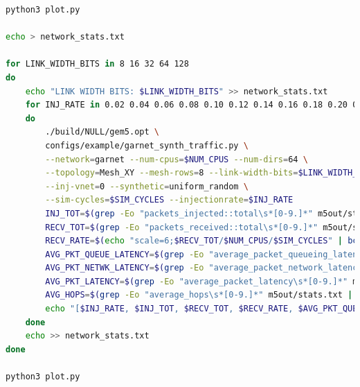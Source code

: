 \documentclass{article}
\begin{document}
\begin{lstlisting}[language=bash]
python3 plot.py

echo > network_stats.txt

for LINK_WIDTH_BITS in 8 16 32 64 128
do
	echo "LINK WIDTH BITS: $LINK_WIDTH_BITS" >> network_stats.txt
	for INJ_RATE in 0.02 0.04 0.06 0.08 0.10 0.12 0.14 0.16 0.18 0.20 0.22 0.24 0.26 0.28 0.30 0.32 0.34 0.36 0.38 0.40 0.42 0.44 0.46 0.48 0.50 0.52 0.54 0.56 0.58 0.60 0.62 0.64 0.66 0.68 0.70 0.72 0.74 0.76 0.78 0.80
	do
		./build/NULL/gem5.opt \
		configs/example/garnet_synth_traffic.py \
		--network=garnet --num-cpus=$NUM_CPUS --num-dirs=64 \
		--topology=Mesh_XY --mesh-rows=8 --link-width-bits=$LINK_WIDTH_BITS\
		--inj-vnet=0 --synthetic=uniform_random \
		--sim-cycles=$SIM_CYCLES --injectionrate=$INJ_RATE
		INJ_TOT=$(grep -Eo "packets_injected::total\s*[0-9.]*" m5out/stats.txt | grep -Eo "[0-9.]*")
		RECV_TOT=$(grep -Eo "packets_received::total\s*[0-9.]*" m5out/stats.txt | grep -Eo "[0-9.]*")
		RECV_RATE=$(echo "scale=6;$RECV_TOT/$NUM_CPUS/$SIM_CYCLES" | bc)
		AVG_PKT_QUEUE_LATENCY=$(grep -Eo "average_packet_queueing_latency\s*[0-9.]*" m5out/stats.txt | grep -Eo "[0-9.]*")
		AVG_PKT_NETWK_LATENCY=$(grep -Eo "average_packet_network_latency\s*[0-9.]*" m5out/stats.txt | grep -Eo "[0-9.]*")
		AVG_PKT_LATENCY=$(grep -Eo "average_packet_latency\s*[0-9.]*" m5out/stats.txt | grep -Eo "[0-9.]*")
		AVG_HOPS=$(grep -Eo "average_hops\s*[0-9.]*" m5out/stats.txt | grep -Eo "[0-9.]*")
		echo "[$INJ_RATE, $INJ_TOT, $RECV_TOT, $RECV_RATE, $AVG_PKT_QUEUE_LATENCY, $AVG_PKT_NETWK_LATENCY, $AVG_PKT_LATENCY, $AVG_HOPS]" >> network_stats.txt
	done
	echo >> network_stats.txt
done

python3 plot.py
\end{lstlisting}
\end{document}
